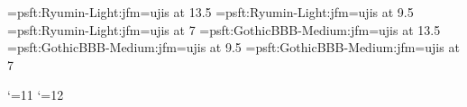 
\jfont\tenmin=psft:Ryumin-Light:jfm=ujis at 13.5\jQ
\jfont\sevenmin=psft:Ryumin-Light:jfm=ujis at 9.5\jQ
\jfont\fivemin=psft:Ryumin-Light:jfm=ujis at 7\jQ
\jfont\tengt=psft:GothicBBB-Medium:jfm=ujis at 13.5\jQ
\jfont\sevengt=psft:GothicBBB-Medium:jfm=ujis at 9.5\jQ
\jfont\fivegt=psft:GothicBBB-Medium:jfm=ujis at 7\jQ

\let\mc=\tenmin
\let\gt=\tengt
\mc
\catcode`\@=11 \catcode`\@=12



\endinput